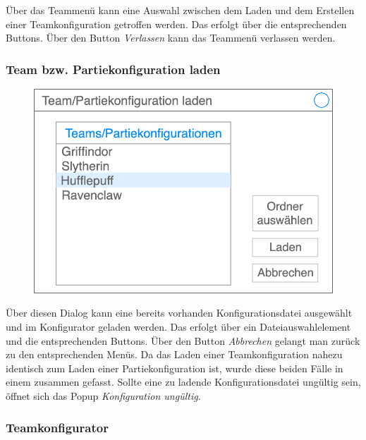     Über das Teammenü kann eine Auswahl zwischen dem Laden und dem Erstellen einer Teamkonfiguration getroffen werden. Das erfolgt über die entsprechenden Buttons. Über den Button \textit{Verlassen} kann das Teammenü verlassen werden.

    \subsubsection{Team bzw. Partiekonfiguration laden}

    \begin{figure}[H]
        \centering
        \includegraphics[width=\textwidth/2]{images/laden}
    \end{figure}

    Über diesen Dialog kann eine bereits vorhanden Konfigurationsdatei ausgewählt und im Konfigurator geladen werden. Das erfolgt über ein Dateiauswahlelement und die entsprechenden Buttons. Über den Button \textit{Abbrechen} gelangt man zurück zu den entsprechenden Menüs. Da das Laden einer Teamkonfiguration nahezu identisch zum Laden einer Partiekonfiguration ist, wurde diese beiden Fälle in einem zusammen gefasst. Sollte eine zu ladende Konfigurationsdatei ungültig sein, öffnet sich das Popup \textit{Konfiguration ungültig}.


    \subsubsection{Teamkonfigurator}

